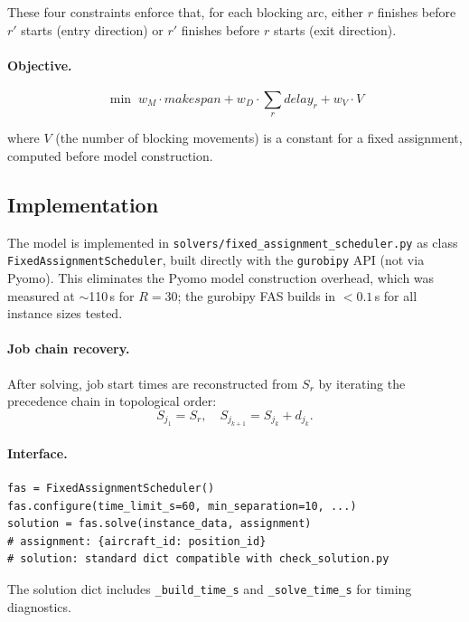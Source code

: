 These four constraints enforce that, for each blocking arc, either $r$
finishes before $r'$ starts (entry direction) or $r'$ finishes before $r$
starts (exit direction).

\paragraph{Objective.}

\begin{equation}
\min\; w_M \cdot \mathit{makespan} + w_D \cdot \sum_r \mathit{delay}_r
     + w_V \cdot V
\label{fas:obj}
\end{equation}

where $V$ (the number of blocking movements) is a constant for a fixed
assignment, computed before model construction.

\subsection{Implementation}

The model is implemented in \texttt{solvers/fixed\_assignment\_scheduler.py}
as class \texttt{FixedAssignmentScheduler}, built directly with the
\texttt{gurobipy} API (not via Pyomo).  This eliminates the Pyomo model
construction overhead, which was measured at $\sim$110\,s for $R=30$; the
gurobipy FAS builds in $<0.1$\,s for all instance sizes tested.

\paragraph{Job chain recovery.}
After solving, job start times are reconstructed from $S_r$ by iterating
the precedence chain in topological order:
\[
    S_{j_1} = S_r, \quad S_{j_{k+1}} = S_{j_k} + d_{j_k}.
\]

\paragraph{Interface.}
\begin{verbatim}
fas = FixedAssignmentScheduler()
fas.configure(time_limit_s=60, min_separation=10, ...)
solution = fas.solve(instance_data, assignment)
# assignment: {aircraft_id: position_id}
# solution: standard dict compatible with check_solution.py
\end{verbatim}

The solution dict includes \texttt{\_build\_time\_s} and \texttt{\_solve\_time\_s}
for timing diagnostics.


